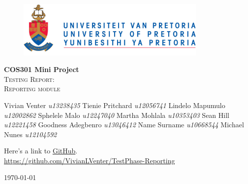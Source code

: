 \begin{titlepage}
	\begin{center}
		
		\begin{figure}[t]
			\centering
			\includegraphics[width=350px]{images/UP_Logo.png}
		\end{figure}
		
		\textbf{\Large COS301 Mini Project } \\
		\textsc{\Large Testing Report:  } \\
		\textsc{\Large Reporting module } \\
		
		\begin{flushright} \large
			Vivian Venter 		\emph{u13238435} \newline
			Tienie Pritchard 	\emph{u12056741} \newline
			Lindelo Mapumulo	\emph{u12002862} \newline
			Sphelele Malo 		\emph{u12247040} \newline
			Martha Mohlala 		\emph{u10353403} \newline
			Sean Hill		\emph{u12221458} \newline
			Goodness Adegbenro	\emph{u13046412} \newline
			Name Surname 		\emph{u10668544} \newline
			Michael Nunes 		\emph{u12104592} \newline
		\end{flushright}
		
		\vfill
		
	Here's a link to \href{https://github.com/VivianLVenter/TestPhase-Reporting}{GitHub}.\\
	\url{https://github.com/VivianLVenter/TestPhase-Reporting}

	\vfill

	{\large \today}		
		
		
	\end{center}
\end{titlepage}
